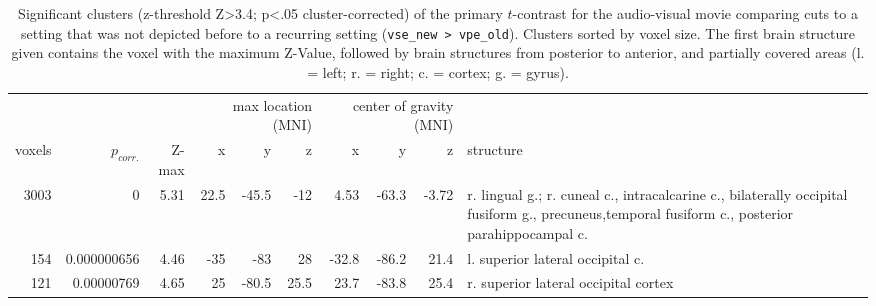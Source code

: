 \documentclass[english]{article}
\begin{document}
\begin{table}[h!]
\caption{Significant clusters (z-threshold Z>3.4; p<.05 cluster-corrected)
    of the primary $t$-contrast for the audio-visual movie comparing cuts to a
    setting that was not depicted before to a recurring setting
    (\texttt{vse\_new > vpe\_old}).
    Clusters sorted by voxel size.
    The first brain structure given contains the voxel with the maximum Z-Value,
    followed by brain structures from posterior to anterior, and partially
    covered areas (l. = left; r. = right; c. = cortex; g. = gyrus).}
\label{tab:res-av-group1}
\begin{tabular}{rrrrrrrrrp{3cm}}
\toprule
& & & \multicolumn{3}{r}{max location (MNI)} & \multicolumn{3}{r}{center of gravity (MNI)} &
\\ \cmidrule{4-6} \cmidrule{7-9}
voxels & $p_{corr.}$ & Z-max & x & y & z  & x & y & z & structure \\
\midrule
3003 & 0 & 5.31 & 22.5 & -45.5 & -12 & 4.53 & -63.3 & -3.72 & r. lingual g.; r.
cuneal c., intracalcarine c., bilaterally occipital fusiform g., precuneus,temporal fusiform c., posterior parahippocampal c.  \\
154 & 0.000000656 & 4.46 & -35 & -83 & 28 & -32.8 & -86.2 & 21.4 & l. superior lateral occipital c. \\
121 & 0.00000769 & 4.65 & 25 & -80.5 & 25.5 & 23.7 & -83.8 & 25.4 & r. superior lateral occipital cortex \\
\bottomrule
\end{tabular}
\end{table}
\end{document}

